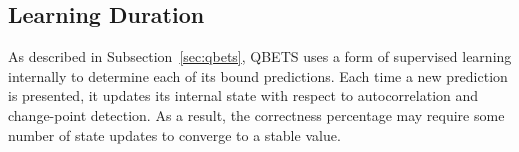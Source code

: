 %

\subsection{Learning Duration}
\label{sec:learning}

As described in Subsection~\ref{sec:qbets},
QBETS uses a form of supervised learning internally to determine each of its
bound predictions.  Each time a new prediction is presented, it updates its
internal state with respect to autocorrelation and change-point detection.  As
a result, the correctness percentage may require some number of state updates
to converge to a stable value.


